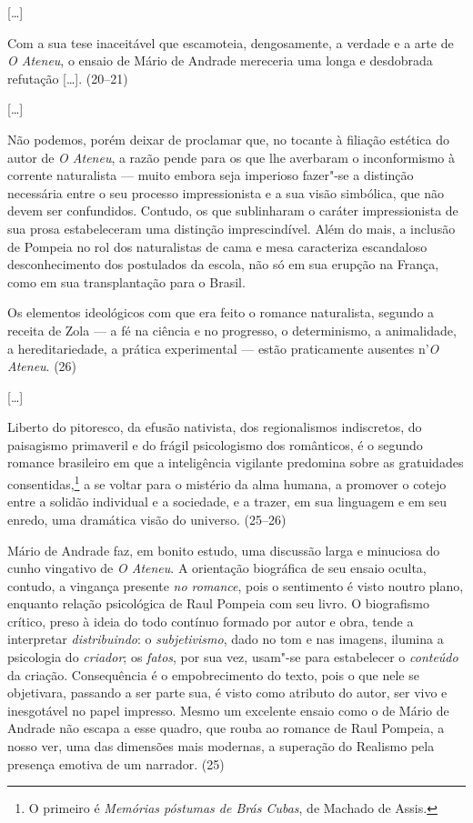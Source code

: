 [\ldots]

Com a sua tese inaceitável que escamoteia, dengosamente,
a verdade e a arte de \textit{O Ateneu}, o
ensaio de Mário de Andrade mereceria uma longa e desdobrada refutação
[\ldots]. (20--21)

[\ldots]

Não podemos, porém deixar de proclamar que, no tocante à
filiação estética do autor de \textit{O Ateneu}, a razão pende para os que lhe averbaram o
inconformismo à corrente naturalista --- muito embora seja imperioso
fazer"-se a distinção necessária entre o seu processo impressionista e
a sua visão simbólica, que não devem ser confundidos. Contudo, os que
sublinharam o caráter impressionista de sua prosa estabeleceram uma
distinção imprescindível. Além do mais, a inclusão de Pompeia no rol
dos naturalistas de cama e mesa caracteriza escandaloso desconhecimento
dos postulados da escola, não só em sua erupção na França, como em sua
transplantação para o Brasil. 

Os elementos ideológicos com que era feito o romance
naturalista, segundo a receita de Zola --- a fé na ciência e no
progresso, o determinismo, a animalidade, a hereditariedade, a prática
experimental --- estão praticamente ausentes n'\textit{O Ateneu}. (26)

[\ldots]

Liberto do pitoresco, da efusão nativista, dos
regionalismos indiscretos, do paisagismo primaveril e do frágil
psicologismo dos românticos, é o segundo romance brasileiro em que a
inteligência vigilante predomina sobre as gratuidades
consentidas,\footnote{O primeiro é \textit{Memórias póstumas de Brás
Cubas}, de Machado de Assis.} a se voltar para o
mistério da alma humana, a promover o cotejo entre a solidão individual
e a sociedade, e a trazer, em sua linguagem e em seu enredo, uma
dramática visão do universo. (25--26)  



Mário de Andrade faz, em bonito estudo, uma discussão
larga e minuciosa do cunho vingativo de \textit{O
Ateneu}. A orientação biográfica de seu ensaio oculta,
contudo, a vingança presente \textit{no
romance}, pois o sentimento é visto noutro plano,
enquanto relação psicológica de Raul Pompeia com seu livro. O
biografismo crítico, preso à ideia do todo contínuo formado por autor e
obra, tende a interpretar
\textit{distribuindo}: o
\textit{subjetivismo}, dado no tom e nas
imagens, ilumina a psicologia do
\textit{criador}; os
\textit{fatos}, por sua vez, usam"-se para
estabelecer o \textit{conteúdo} da criação.
Consequência é o empobrecimento do texto, pois o que nele se
objetivara, passando a ser parte sua, é visto como atributo do autor,
ser vivo e inesgotável no papel impresso. Mesmo um excelente ensaio
como o de Mário de Andrade não escapa a esse quadro, que rouba ao
romance de Raul Pompeia, a nosso ver, uma das dimensões mais modernas,
a superação do Realismo pela presença emotiva de um narrador. (25) 

